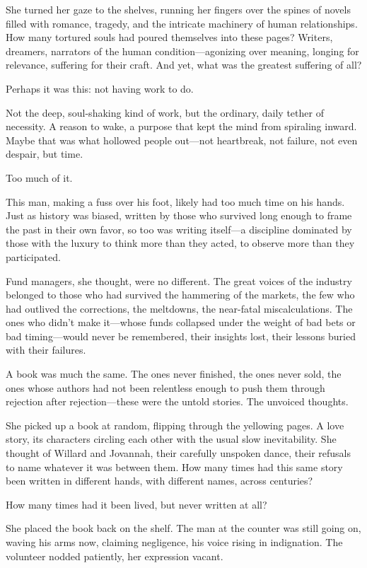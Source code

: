 She turned her gaze to the shelves, running her fingers over the spines of novels filled with romance, tragedy, and the intricate machinery of human relationships. How many tortured souls had poured themselves into these pages? Writers, dreamers, narrators of the human condition—agonizing over meaning, longing for relevance, suffering for their craft. And yet, what was the greatest suffering of all?

Perhaps it was this: not having work to do.

Not the deep, soul-shaking kind of work, but the ordinary, daily tether of necessity. A reason to wake, a purpose that kept the mind from spiraling inward. Maybe that was what hollowed people out—not heartbreak, not failure, not even despair, but time.

Too much of it.

This man, making a fuss over his foot, likely had too much time on his hands. Just as history was biased, written by those who survived long enough to frame the past in their own favor, so too was writing itself—a discipline dominated by those with the luxury to think more than they acted, to observe more than they participated.

Fund managers, she thought, were no different. The great voices of the industry belonged to those who had survived the hammering of the markets, the few who had outlived the corrections, the meltdowns, the near-fatal miscalculations. The ones who didn’t make it—whose funds collapsed under the weight of bad bets or bad timing—would never be remembered, their insights lost, their lessons buried with their failures.

A book was much the same. The ones never finished, the ones never sold, the ones whose authors had not been relentless enough to push them through rejection after rejection—these were the untold stories. The unvoiced thoughts.

She picked up a book at random, flipping through the yellowing pages. A love story, its characters circling each other with the usual slow inevitability. She thought of Willard and Jovannah, their carefully unspoken dance, their refusals to name whatever it was between them. How many times had this same story been written in different hands, with different names, across centuries?

How many times had it been lived, but never written at all?

She placed the book back on the shelf. The man at the counter was still going on, waving his arms now, claiming negligence, his voice rising in indignation. The volunteer nodded patiently, her expression vacant.

